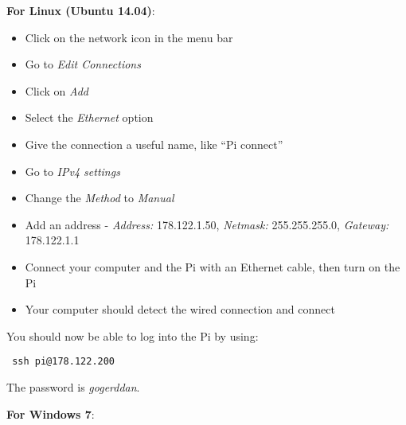 \documentclass[10pt]{article}
\begin{document}
\textbf{For Linux (Ubuntu 14.04)}:

\begin{itemize}
 \item Click on the network icon in the menu bar
 \item Go to \textit{Edit Connections}
 \item Click on \textit{Add}
 \item Select the \textit{Ethernet} option
 \item Give the connection a useful name, like ``Pi connect''
 \item Go to \textit{IPv4 settings}
 \item Change the \textit{Method} to \textit{Manual}
 \item Add an address - \textit{Address:} 178.122.1.50, \textit{Netmask:} 255.255.255.0, \textit{Gateway:} 178.122.1.1
 \item Connect your computer and the Pi with an Ethernet cable, then turn on the Pi
 \item Your computer should detect the wired connection and connect 
\end{itemize}

You should now be able to log into the Pi by using:
\begin{verbatim}
 ssh pi@178.122.200
\end{verbatim}

The password is \textit{gogerddan}. \newline

\textbf{For Windows 7}:
\end{document}
